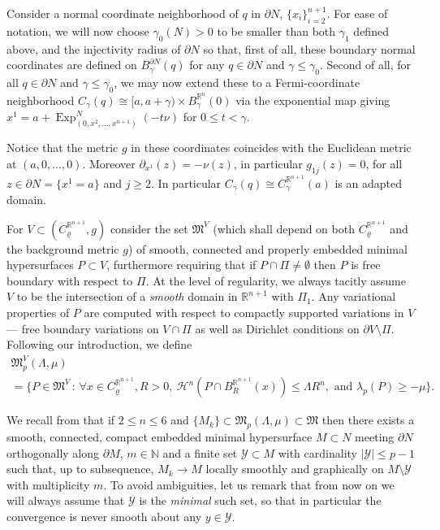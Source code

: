 \documentclass[JEP,XML,SOM,Unicode]{cedram}
\let\mathcal\mathscr
\newcommand{\sep}{\,:\,}
\DeclareMathOperator{\Exp}{Exp}
\theoremstyle{definition}
\newcommand{\R}{\mathbb{R}}
\newcommand{\h}{\mathscr{H}}
\begin{document}
Consider a normal coordinate neighborhood of $q$ in $\partial N$, $\{x_i\}_{i=2}^{n+1}$. For ease of nota\-tion, we will now choose $\gamma_0(N) >0$ to be smaller than both $\gamma_1$ defined above, and the injectivity radius of $\partial N$ so that, first of all, these boundary normal coordinates are defined on $B^{\partial N}_\gamma (q)$ for any $q\in \partial N$ and $\gamma \leq \gamma_0$. Second of all, for all $q\in \partial N$ and $\gamma\leq \gamma_0$, we may now extend these to a Fermi-coordinate neighborhood $C_{\gamma}(q) \cong [a,a+\gamma)\times B^{\R^n}_\gamma (0)$ via the exponential map giving $x^{1} = a+ \Exp^N_{(0,x^2,\dots,x^{n+1})} (-t\nu)$ for $0\leq t<\gamma$.

Notice that the metric $g$ in these coordinates coincides with the Euclidean metric at $(a,0,\dots,0)$. Moreover $\partial_{x^1}(z) = -\nu(z)$, in particular $g_{1j}(z)=0$, for all $z\in \partial N = \{x^1=a\}$ and $j\geq 2$. In particular $C_\gamma(q)\cong C^{\R^{n+1}}_\gamma(a)$ is an adapted domain. 

For $V\subset (C^{\R^{n+1}}_\varrho,g)$ consider the set $\mathfrak{M}^{V}$ (which shall depend on both $C^{\R^{n+1}}_\varrho$ and the background metric $g$) of smooth, connected and properly embedded minimal hypersurfaces $P\subset V$, furthermore requiring that if $P\cap \Pi \neq \emptyset$ then $P$ is free boundary with respect to $\Pi$. At the level of regularity, we always tacitly assume $V$ to be the intersection of a \emph{smooth} domain in $\R^{n+1}$ with $\Pi_1$. Any variational properties of $P$ are computed with respect to compactly supported variations in $V$ --- \ie free boundary variations on $V\cap \Pi$ as well as Dirichlet conditions on $\partial V\setminus \Pi$. Following our introduction, we define
\begin{multline*}
\mathfrak{M}^{V}_p(\Lambda,\mu)\\
= \big\{ P \in \mathfrak{M}^{V}\sep \forall x\in C^{\R^{n+1}}_\varrho, R>0, \ \h^n(P\cap B^{\R^{n+1}}_R(x))\leq \Lambda R^n, \text{ and }\lambda_p(P) \geq -\mu \big\}.
\end{multline*}

We recall from \cite[Th.\,29]{ACS17} that if $2\leq n\leq 6$ and $\{M_k\}\subset \mathfrak{M}_p(\Lambda, \mu) \subset \mathfrak{M}$ then there exists a smooth, connected, compact embedded minimal hypersurface $M\subset N$ meeting $\partial N$ orthogonally along $\partial M$, $m\in \mathbb{N}$ and a finite set $\mathcal{Y}\subset M$ with cardinality $|\mathcal{Y}|\leq p-1$ such that, up to subsequence, $M_k \to M$ locally smoothly and graphically on $M\setminus \mathcal{Y}$ with multiplicity $m$. To avoid ambiguities, let us remark that from now on we will always assume that $\mathcal{Y}$ is the \emph{minimal} such set, so that in particular the convergence is never smooth about any $y\in\mathcal{Y}$.
\end{document}
